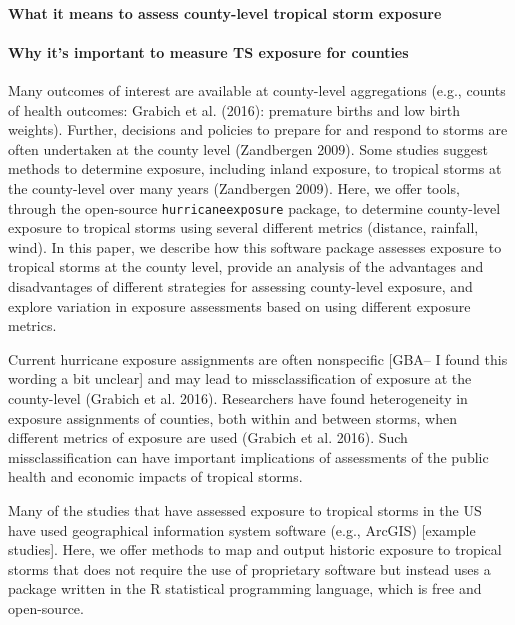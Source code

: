 \documentclass[]{elsarticle} %
\begin{document}
\paragraph{What it means to assess county-level tropical storm
exposure}\label{what-it-means-to-assess-county-level-tropical-storm-exposure}

\paragraph{Why it's important to measure TS exposure for
counties}\label{why-its-important-to-measure-ts-exposure-for-counties}

Many outcomes of interest are available at county-level aggregations
(e.g., counts of health outcomes: Grabich et al. (2016): premature
births and low birth weights). Further, decisions and policies to
prepare for and respond to storms are often undertaken at the county
level (Zandbergen 2009). Some studies suggest methods to determine
exposure, including inland exposure, to tropical storms at the
county-level over many years (Zandbergen 2009). Here, we offer tools,
through the open-source \texttt{hurricaneexposure} package, to determine
county-level exposure to tropical storms using several different metrics
(distance, rainfall, wind). In this paper, we describe how this software
package assesses exposure to tropical storms at the county level,
provide an analysis of the advantages and disadvantages of different
strategies for assessing county-level exposure, and explore variation in
exposure assessments based on using different exposure metrics.

Current hurricane exposure assignments are often nonspecific {[}GBA-- I
found this wording a bit unclear{]} and may lead to missclassification
of exposure at the county-level (Grabich et al. 2016). Researchers have
found heterogeneity in exposure assignments of counties, both within and
between storms, when different metrics of exposure are used (Grabich et
al. 2016). Such missclassification can have important implications of
assessments of the public health and economic impacts of tropical
storms.

Many of the studies that have assessed exposure to tropical storms in
the US have used geographical information system software (e.g., ArcGIS)
{[}example studies{]}. Here, we offer methods to map and output historic
exposure to tropical storms that does not require the use of proprietary
software but instead uses a package written in the R statistical
programming language, which is free and open-source.
\end{document}

